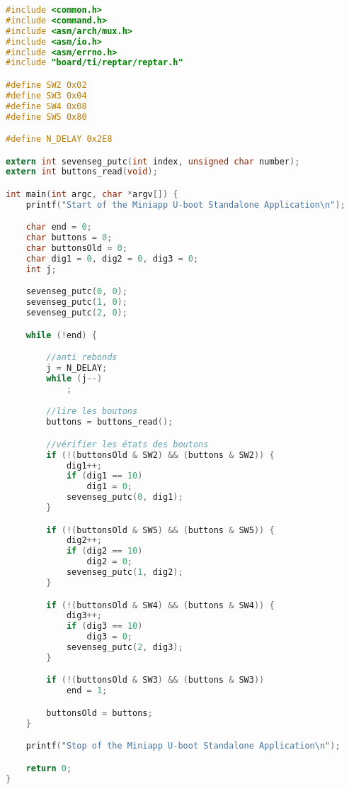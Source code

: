 \begin{lstlisting}[language=C,caption=main]
#include <common.h>
#include <command.h>
#include <asm/arch/mux.h>
#include <asm/io.h>
#include <asm/errno.h>
#include "board/ti/reptar/reptar.h"

#define SW2 0x02
#define SW3 0x04
#define SW4 0x08
#define SW5 0x80

#define N_DELAY 0x2E8

extern int sevenseg_putc(int index, unsigned char number);
extern int buttons_read(void);

int main(int argc, char *argv[]) {
	printf("Start of the Miniapp U-boot Standalone Application\n");

	char end = 0;
	char buttons = 0;
	char buttonsOld = 0;
	char dig1 = 0, dig2 = 0, dig3 = 0;
	int j;

	sevenseg_putc(0, 0);
	sevenseg_putc(1, 0);
	sevenseg_putc(2, 0);

	while (!end) {

		//anti rebonds
		j = N_DELAY;
		while (j--)
			;

		//lire les boutons
		buttons = buttons_read();

		//vérifier les états des boutons
		if (!(buttonsOld & SW2) && (buttons & SW2)) {
			dig1++;
			if (dig1 == 10)
				dig1 = 0;
			sevenseg_putc(0, dig1);
		}

		if (!(buttonsOld & SW5) && (buttons & SW5)) {
			dig2++;
			if (dig2 == 10)
				dig2 = 0;
			sevenseg_putc(1, dig2);
		}

		if (!(buttonsOld & SW4) && (buttons & SW4)) {
			dig3++;
			if (dig3 == 10)
				dig3 = 0;
			sevenseg_putc(2, dig3);
		}

		if (!(buttonsOld & SW3) && (buttons & SW3))
			end = 1;

		buttonsOld = buttons;
	}

	printf("Stop of the Miniapp U-boot Standalone Application\n");

	return 0;
}
\end{lstlisting}

